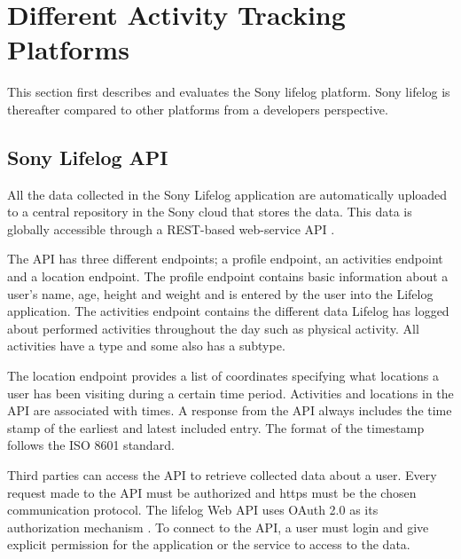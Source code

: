\documentclass{cslthse-msc}
\begin{document}





\section{Different Activity Tracking Platforms}
This section first describes and evaluates the Sony lifelog platform. Sony lifelog is thereafter compared to other platforms from a developers perspective. 


\subsection{Sony Lifelog API} 
All the data collected in the Sony Lifelog application are automatically uploaded to a central repository in the Sony cloud that stores the data. This data is globally accessible through a REST-based web-service API \cite{LifeLogDescr}. 

The API has three different endpoints; a profile endpoint, an activities endpoint and a location endpoint. The profile endpoint contains basic information about a user's name, age, height and weight and is entered by the user into the Lifelog application. The activities endpoint contains the different data Lifelog has logged about performed activities throughout the day such as physical activity. All activities have a type and some also has a subtype. 

The location endpoint provides a list of coordinates specifying what locations a user has been visiting during a certain time period. Activities and locations in the API are associated with times. A response from the API always includes the time stamp of the earliest and latest included entry. The format of the timestamp follows the ISO 8601 standard. 

Third parties can access the API to retrieve collected data about a user. Every request made to the API must be authorized and https must be the chosen communication protocol. The lifelog Web API uses OAuth 2.0 as its authorization mechanism \cite{LifeLogDescr}. To connect to the API, a user must login and give explicit permission for the application or the service to access to the data. 
\end{document}
